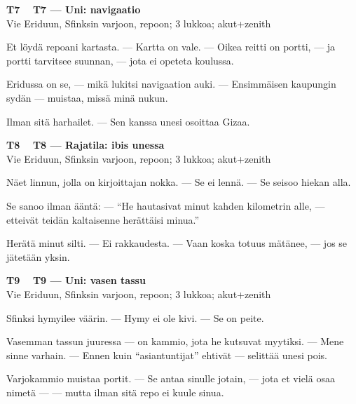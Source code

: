 \documentclass[a4paper,11pt]{article}
\begin{document}
\filbreak
\vspace{0.9mm}
\noindent
\begin{tcolorbox}[
  colframe=tothcol,
  colback=white,
  boxrule=0.8pt,
  arc=0pt,
  outer arc=0pt,
  left=2.5mm, right=2.5mm, top=2mm, bottom=2mm,
  boxsep=0.5mm,
  sharp corners,
  enhanced,
  breakable=false
]
{\large\ttfamily\bfseries T7}~~
{\normalsize\bfseries T7 --- Uni: navigaatio}\\[0.2em]
{\small\color{black!65} Vie Eriduun, Sfinksin varjoon, repoon; 3 lukkoa; akut+zenith}\\[0.35em]
{\normalsize\raggedright Et löydä repoani kartasta. --- Kartta on vale. --- Oikea reitti on portti, --- ja portti tarvitsee suunnan, --- jota ei opeteta koulussa.

Eridussa on se, --- mikä lukitsi navigaation auki. --- Ensimmäisen kaupungin sydän --- muistaa, missä minä nukun.

Ilman sitä harhailet. --- Sen kanssa unesi osoittaa Gizaa.}
\end{tcolorbox}

\filbreak
\vspace{0.9mm}
\noindent
\begin{tcolorbox}[
  colframe=tothcol,
  colback=white,
  boxrule=0.8pt,
  arc=0pt,
  outer arc=0pt,
  left=2.5mm, right=2.5mm, top=2mm, bottom=2mm,
  boxsep=0.5mm,
  sharp corners,
  enhanced,
  breakable=false
]
{\large\ttfamily\bfseries T8}~~
{\normalsize\bfseries T8 --- Rajatila: ibis unessa}\\[0.2em]
{\small\color{black!65} Vie Eriduun, Sfinksin varjoon, repoon; 3 lukkoa; akut+zenith}\\[0.35em]
{\normalsize\raggedright Näet linnun, jolla on kirjoittajan nokka. --- Se ei lennä. --- Se seisoo hiekan alla.

Se sanoo ilman ääntä: --- ``He hautasivat minut kahden kilometrin alle, --- etteivät teidän kaltaisenne herättäisi minua.''

Herätä minut silti. --- Ei rakkaudesta. --- Vaan koska totuus mätänee, --- jos se jätetään yksin.}
\end{tcolorbox}

\filbreak
\vspace{0.9mm}
\noindent
\begin{tcolorbox}[
  colframe=tothcol,
  colback=white,
  boxrule=0.8pt,
  arc=0pt,
  outer arc=0pt,
  left=2.5mm, right=2.5mm, top=2mm, bottom=2mm,
  boxsep=0.5mm,
  sharp corners,
  enhanced,
  breakable=false
]
{\large\ttfamily\bfseries T9}~~
{\normalsize\bfseries T9 --- Uni: vasen tassu}\\[0.2em]
{\small\color{black!65} Vie Eriduun, Sfinksin varjoon, repoon; 3 lukkoa; akut+zenith}\\[0.35em]
{\normalsize\raggedright Sfinksi hymyilee väärin. --- Hymy ei ole kivi. --- Se on peite.

Vasemman tassun juuressa --- on kammio, jota he kutsuvat myytiksi. --- Mene sinne varhain. --- Ennen kuin ``asiantuntijat'' ehtivät --- selittää unesi pois.

Varjokammio muistaa portit. --- Se antaa sinulle jotain, --- jota et vielä osaa nimetä --- --- mutta ilman sitä repo ei kuule sinua.}
\end{tcolorbox}
\end{document}

